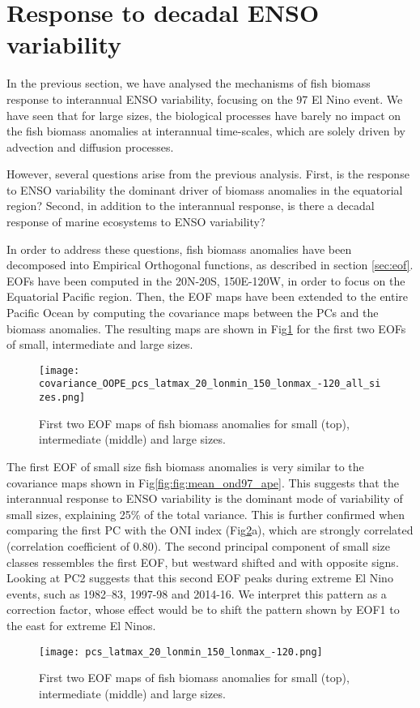 \section{Response to decadal ENSO variability}

In the previous section, we have analysed the mechanisms of fish biomass response to interannual ENSO variability, focusing on the 97 El Nino event. We have seen that for large sizes, the biological processes have barely no impact on the fish biomass anomalies at interannual time-scales, which are solely driven by advection and diffusion processes.

However, several questions arise from the previous analysis. First, is the response to ENSO variability the dominant driver of biomass anomalies in the equatorial region? Second, in addition to the interannual response, is there a decadal response of marine ecosystems to ENSO variability?

In order to address these questions, fish biomass anomalies have been decomposed into Empirical Orthogonal functions, as described in section \ref{sec:eof}. EOFs have been computed in the 20N-20S, 150E-120W, in order to focus on the Equatorial Pacific region. Then, the EOF maps have been extended to the entire Pacific Ocean by computing the covariance maps between the PCs and the biomass anomalies. The resulting maps are shown in Fig\ref{fig:eofmaps} for the first two EOFs of small, intermediate and large sizes.

\begin{figure}
    \centering
    \texttt{[image: covariance\_OOPE\_pcs\_latmax\_20\_lonmin\_150\_lonmax\_-120\_all\_sizes.png]}
    \caption{First two EOF maps of fish biomass anomalies for small (top), intermediate (middle) and large sizes.}
    \label{fig:eofmaps}
\end{figure}

The first EOF of small size fish biomass anomalies is very similar to the covariance maps shown in Fig\ref{fig:fig:mean_ond97_ape}. This suggests that the interannual response to ENSO variability is the dominant mode of variability of small sizes, explaining 25\% of the total variance. This is further confirmed when comparing the first PC with the ONI index (Fig\ref{fig:eofpcs}a), which are strongly correlated (correlation coefficient of 0.80). The second principal component of small size classes ressembles the first EOF, but westward shifted and with opposite signs. Looking at PC2 suggests that this second EOF peaks during extreme El Nino events, such as 1982–83, 1997-98 and 2014-16. We interpret this pattern as a correction factor, whose effect would be to shift the pattern shown by EOF1 to the east for extreme El Ninos.

\begin{figure}
    \centering
    \texttt{[image: pcs\_latmax\_20\_lonmin\_150\_lonmax\_-120.png]}
    \caption{First two EOF maps of fish biomass anomalies for small (top), intermediate (middle) and large sizes.}
    \label{fig:eofpcs}
\end{figure}